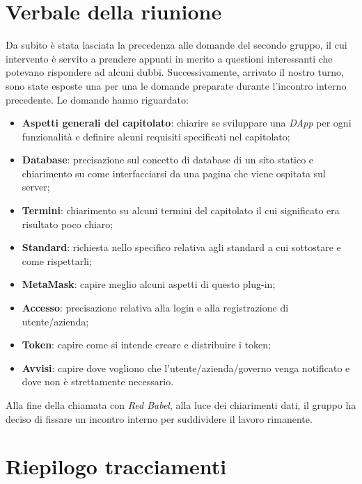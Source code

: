 \section{Verbale della riunione}
Da subito è stata lasciata la precedenza alle domande del secondo gruppo,
il cui intervento è servito a prendere appunti in merito a questioni interessanti
che potevano rispondere ad alcuni dubbi. Successivamente, arrivato il nostro turno,
sono state esposte una per una le domande preparate durante l'incontro interno 
precedente.\newline
Le domande hanno riguardato:

\begin{itemize}
	\item \textbf{Aspetti generali del capitolato}: chiarire se sviluppare una 
			\textit{DApp} per ogni funzionalità e definire alcuni requisiti specificati
			 nel capitolato;
	\item \textbf{Database}: precisazione sul concetto di database di un sito statico
			 e chiarimento su come interfacciarsi da una pagina che viene ospitata sul server;
	\item \textbf{Termini}: chiarimento su alcuni termini del capitolato il cui significato
			 era risultato poco chiaro;
	\item \textbf{Standard}: richiesta nello specifico relativa agli standard a cui sottostare
			 e come rispettarli;
	\item \textbf{MetaMask}: capire meglio alcuni aspetti di questo plug-in;
	\item \textbf{Accesso}: precisazione relativa alla login e alla registrazione di 
			 utente/azienda;
	\item \textbf{Token\glo{}}: capire come si intende creare e distribuire i token;
	\item \textbf{Avvisi}: capire dove vogliono che l'utente/azienda/governo venga 
			 notificato e dove non è strettamente necessario.
\end{itemize}
Alla fine della chiamata con \textit{Red Babel}, alla luce dei chiarimenti dati,
il gruppo ha deciso di fissare un incontro interno per suddividere il lavoro rimanente.
\pagebreak

\section{Riepilogo tracciamenti}

	
